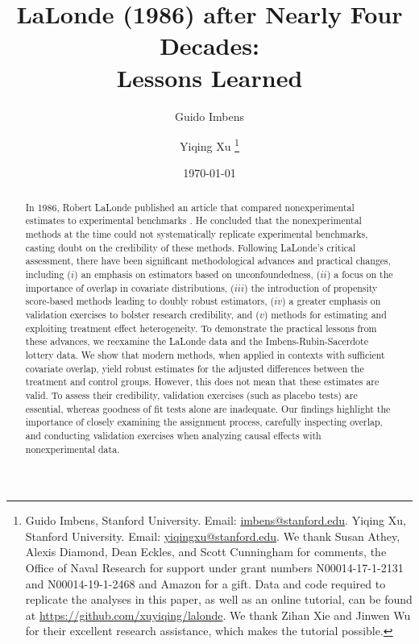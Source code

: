 \documentclass[letterpaper,12pt,leqno]{article}
\begin{document}
\title{LaLonde (1986) after Nearly Four Decades:\\Lessons Learned}
\author{Guido Imbens \and Yiqing Xu
\thanks{Guido Imbens, Stanford University. Email: \url{imbens@stanford.edu}. Yiqing Xu, Stanford University. Email: \url{yiqingxu@stanford.edu}.
We thank Susan Athey, Alexis Diamond, Dean Eckles, and Scott Cunningham for comments, 
the Office of Naval Research for support under grant numbers N00014-17-1-2131 and N00014-19-1-2468 and Amazon for a gift. Data and code required to replicate the analyses in this paper, as well as an online tutorial, can be found at \url{https://github.com/xuyiqing/lalonde}. We thank Zihan Xie and Jinwen Wu for their excellent research assistance, which makes the tutorial possible.}}
\date{\today}                       
\begin{titlepage}\maketitle

\vspace{-2em}\begin{abstract}\noindent
In 1986, Robert LaLonde published an article that compared nonexperimental estimates to experimental benchmarks \citep{LaLonde}. He concluded that the nonexperimental methods at the time could not systematically replicate experimental benchmarks, casting doubt on the credibility of these methods. Following LaLonde's critical assessment, there have been significant methodological advances and practical changes, including ($i$) an emphasis on estimators based on unconfoundedness, ($ii$) a focus on the importance of overlap in covariate distributions, ($iii$) the introduction of propensity score-based methods leading to doubly robust estimators, ($iv$) a greater emphasis on validation exercises to bolster research credibility, and ($v$) methods for estimating and exploiting treatment effect heterogeneity.  To demonstrate the practical lessons from these advances, we reexamine the LaLonde data and the Imbens-Rubin-Sacerdote lottery data. We show that modern methods, when applied in contexts with sufficient covariate overlap, yield robust estimates for the adjusted differences between the treatment and control groups. However, this does not mean that these estimates are valid. To assess their credibility, validation exercises (such as placebo tests) are essential, whereas goodness of fit tests alone are inadequate. Our findings highlight the importance of closely examining the assignment process, carefully inspecting overlap, and conducting validation exercises when analyzing causal effects with nonexperimental data.
\end{abstract}



\end{titlepage}
\end{document}
